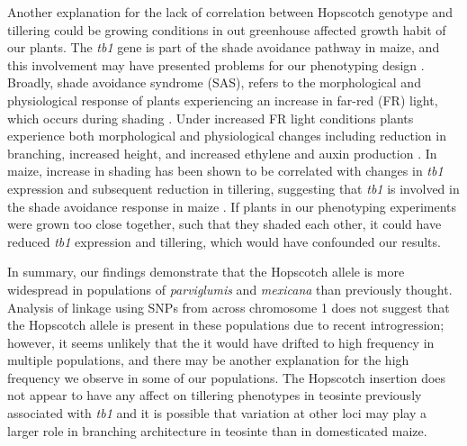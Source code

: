 \documentclass[12pt]{article}
\begin{document}
Another explanation for the lack of correlation between Hopscotch genotype and tillering could be growing conditions in out greenhouse affected growth habit of our plants. The \emph{tb1} gene is part of the shade avoidance pathway in maize, and this involvement may have presented problems for our phenotyping design \citep{Kebrom and Brutnell 2007}. Broadly, shade avoidance syndrome (SAS), refers to the morphological and physiological response of plants experiencing an increase in far-red (FR) light, which occurs during shading \cite{Kebrom and Brutnell 2007}. Under increased FR light conditions plants experience both morphological and physiological changes including reduction in branching, increased height, and increased ethylene and auxin production \cite{Ballare 1999, Smith and Whitelam 1997}. In maize, increase in shading has been shown to be correlated with changes in \emph{tb1} expression and subsequent reduction in tillering, suggesting that \emph{tb1} is involved in the shade avoidance response in maize \cite{Doebley et al 1997, Lukens and Doebley 1999}. If plants in our phenotyping experiments were grown too close together, such that they shaded each other, it could have reduced \emph{tb1} expression and tillering, which would have confounded our results. 

In summary, our findings demonstrate that the Hopscotch allele is more widespread in populations of \emph{parviglumis} and \emph{mexicana} than previously thought. Analysis of linkage using SNPs from across chromosome 1 does not suggest that the Hopscotch allele is present in these populations due to recent introgression; however, it seems unlikely that the it would have drifted to high frequency in multiple populations, and there may be another explanation for the high frequency we observe in some of our populations. The Hopscotch insertion does not appear to have any affect on tillering phenotypes in teosinte previously associated with \emph{tb1} and it is possible that variation at other loci may play a larger role in branching architecture in teosinte than in domesticated maize.

\clearpage


\end{document}
